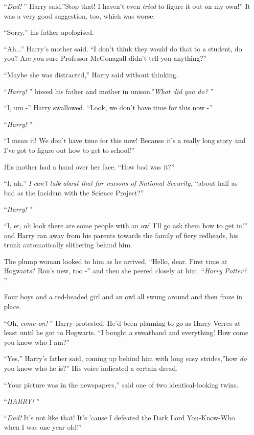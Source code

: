 ``\emph{Dad!} '' Harry said.''Stop that! I haven't even \emph{tried} to
figure it out on my own!'' It was a very good suggestion, too, which was
worse.

``Sorry,'' his father apologised.

``Ah...'' Harry's mother said. ``I don't think they would do that
to a student, do you? Are you sure Professor McGonagall didn't tell you
anything?''

``Maybe she was distracted,'' Harry said without thinking.

``\emph{Harry!} '' hissed his father and mother in unison.''\emph{What did
you do?} ''

``I, um -'' Harry swallowed. ``Look, we don't have time for this now -''

``\emph{Harry!} ''

``I mean it! We don't have time for this now! Because it's a really long
story and I've got to figure out how to get to school!''

His mother had a hand over her face. ``How bad was it?''

``I, ah,'' \emph{I can't talk about that for reasons of National
Security,} ``about half as bad as the Incident with the Science
Project?''

``\emph{Harry!} ''

``I, er, oh look there are some people with an owl I'll go ask them how
to get in!'' and Harry ran away from his parents towards the family of
fiery redheads, his trunk automatically slithering behind him.

The plump woman looked to him as he arrived. ``Hello, dear. First time
at Hogwarts? Ron's new, too -'' and then she peered closely at him.
``\emph{Harry Potter?} ''

Four boys and a red-headed girl and an owl all swung around and then
froze in place.

``Oh, \emph{come on!} '' Harry protested. He'd been planning to go as
Harry Verres at least until he got to Hogwarts. ``I bought a sweatband
and everything! How come you know who I am?''

``Yes,'' Harry's father said, coming up behind him with long easy
strides,''how \emph{do} you know who he is?'' His voice indicated a
certain dread.

``Your picture was in the newspapers,'' said one of two
identical-looking twins.

``\emph{HARRY!} ''

``\emph{Dad!} It's not like that! It's 'cause I defeated the Dark Lord
You-Know-Who when I was one year old!''

